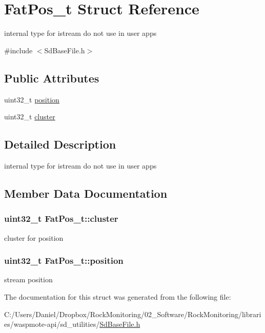 \hypertarget{struct_fat_pos__t}{}\section{Fat\+Pos\+\_\+t Struct Reference}
\label{struct_fat_pos__t}


internal type for istream do not use in user apps  




{\ttfamily \#include $<$Sd\+Base\+File.\+h$>$}

\subsection*{Public Attributes}
\begin{DoxyCompactItemize}
\item 
uint32\+\_\+t \hyperlink{struct_fat_pos__t_a8e14c6f2705777502b543452743eaa26}{position}
\item 
uint32\+\_\+t \hyperlink{struct_fat_pos__t_a7b50657b0debaf0e6231af2c74a655fe}{cluster}
\end{DoxyCompactItemize}


\subsection{Detailed Description}
internal type for istream do not use in user apps 

\subsection{Member Data Documentation}
\subsubsection[{\texorpdfstring{cluster}{cluster}}]{\setlength{\rightskip}{0pt plus 5cm}uint32\+\_\+t Fat\+Pos\+\_\+t\+::cluster}\hypertarget{struct_fat_pos__t_a7b50657b0debaf0e6231af2c74a655fe}{}\label{struct_fat_pos__t_a7b50657b0debaf0e6231af2c74a655fe}
cluster for position 
\subsubsection[{\texorpdfstring{position}{position}}]{\setlength{\rightskip}{0pt plus 5cm}uint32\+\_\+t Fat\+Pos\+\_\+t\+::position}\hypertarget{struct_fat_pos__t_a8e14c6f2705777502b543452743eaa26}{}\label{struct_fat_pos__t_a8e14c6f2705777502b543452743eaa26}
stream position 

The documentation for this struct was generated from the following file\+:\begin{DoxyCompactItemize}
\item 
C\+:/\+Users/\+Daniel/\+Dropbox/\+Rock\+Monitoring/02\+\_\+\+Software/\+Rock\+Monitoring/libraries/waspmote-\/api/sd\+\_\+utilities/\hyperlink{_sd_base_file_8h}{Sd\+Base\+File.\+h}\end{DoxyCompactItemize}
